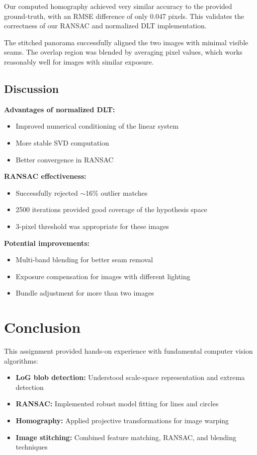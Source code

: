 \documentclass[11pt,a4paper]{article}
\begin{document}
Our computed homography achieved very similar accuracy to the provided ground-truth, with an RMSE difference of only 0.047 pixels. This validates the correctness of our RANSAC and normalized DLT implementation.

The stitched panorama successfully aligned the two images with minimal visible seams. The overlap region was blended by averaging pixel values, which works reasonably well for images with similar exposure.

\subsection{Discussion}

\textbf{Advantages of normalized DLT:}
\begin{itemize}
    \item Improved numerical conditioning of the linear system
    \item More stable SVD computation
    \item Better convergence in RANSAC
\end{itemize}

\textbf{RANSAC effectiveness:}
\begin{itemize}
    \item Successfully rejected $\sim$16\% outlier matches
    \item 2500 iterations provided good coverage of the hypothesis space
    \item 3-pixel threshold was appropriate for these images
\end{itemize}

\textbf{Potential improvements:}
\begin{itemize}
    \item Multi-band blending for better seam removal
    \item Exposure compensation for images with different lighting
    \item Bundle adjustment for more than two images
\end{itemize}

\section{Conclusion}
This assignment provided hands-on experience with fundamental computer vision algorithms:

\begin{itemize}
    \item \textbf{LoG blob detection:} Understood scale-space representation and extrema detection
    \item \textbf{RANSAC:} Implemented robust model fitting for lines and circles
    \item \textbf{Homography:} Applied projective transformations for image warping
    \item \textbf{Image stitching:} Combined feature matching, RANSAC, and blending techniques
\end{itemize}
\end{document}
